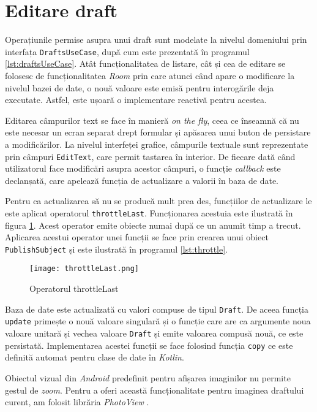 \section{Editare draft}

Operațiunile permise asupra unui draft sunt modelate la nivelul domeniului prin interfața \texttt{DraftsUseCase}, după cum este prezentată în programul \ref{lst:draftsUseCase}. Atât funcționalitatea de listare, cât și cea de editare se folosesc de funcționalitatea \emph{Room} prin care atunci când apare o modificare la nivelul bazei de date, o nouă valoare este emisă pentru interogările deja executate. Astfel, este ușoară o implementare reactivă pentru acestea.



Editarea câmpurilor text se face în manieră \emph{on the fly}, ceea ce înseamnă că nu este necesar un ecran separat drept formular și apăsarea unui buton de persistare a modificărilor. La nivelul interfeței grafice, câmpurile textuale sunt reprezentate prin câmpuri \texttt{EditText}, care permit tastarea în interior. De fiecare dată când utilizatorul face modificări asupra acestor câmpuri, o funcție \emph{callback} este declanșată, care apelează funcția de actualizare a valorii în baza de date.

Pentru ca actualizarea să nu se producă mult prea des, funcțiilor de actualizare le este aplicat operatorul \texttt{throttleLast}. Funcționarea acestuia este ilustrată în figura \ref{fig:throttle}\cite{ThrottleLast}. Acest operator emite obiecte numai după ce un anumit timp a trecut. Aplicarea acestui operator unei funcții se face prin crearea unui obiect \texttt{PublishSubject} și este ilustrată în programul \ref{lst:throttle}.



\begin{figure}[ht]
  \centering
  \texttt{[image: throttleLast.png]}
  \caption{Operatorul throttleLast}
  \label{fig:throttle}
\end{figure}

Baza de date este actualizată cu valori compuse de tipul \texttt{Draft}. De aceea funcția \texttt{update} primește o nouă valoare singulară și o funcție care are ca argumente noua valoare unitară și vechea valoare \texttt{Draft} și emite valoarea compusă nouă, ce este persistată. Implementarea acestei funcții se face folosind funcția \texttt{copy} ce este definită automat pentru clase de date în \emph{Kotlin}.

Obiectul vizual din \emph{Android} predefinit pentru afișarea imaginilor  nu permite gestul de \emph{zoom}. Pentru a oferi această funcționalitate pentru imaginea draftului curent, am folosit librăria \emph{PhotoView} \cite{PhotoView}. 
